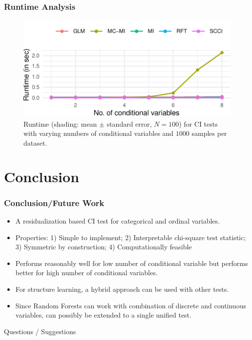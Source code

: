 \documentclass{beamer}
\begin{document}
\begin{frame}
	\frametitle{Runtime Analysis}
	\begin{figure}
		\centering
		\includegraphics{imgs/runtime.pdf}
		\caption*{Runtime (shading: mean $\pm$ standard error, $N=100$)
		for CI tests with varying numbers of conditional variables and
		$1000$ samples per dataset.
		}
	\end{figure}
\end{frame}

\section{Conclusion}
\begin{frame}
	\frametitle{Conclusion/Future Work}
	\begin{itemize}
		\setlength\itemsep{1em}
		\item A residualization based CI test for categorical and
			ordinal variables.
		\item Properties: 1) Simple to implement; 2) Interpretable chi-square test statistic; 3) Symmetric by construction; 4) Computationally feasible
		\item Performs reasonably well for low number of
			conditional variable but performs better for high
			number of conditional variables.
		\item For structure learning, a hybrid approach can be used with other
			tests.
		\item Since Random Forests can work with combination of discrete and 
			continuous variables, can possibly be extended to a single 
			unified test.
	\end{itemize}
\end{frame}

\begin{frame}
	\begin{center}
		\Huge{Questions / Suggestions}
	\end{center}
\end{frame}
\end{document}
